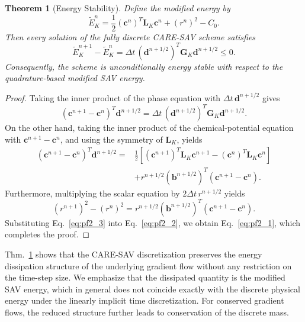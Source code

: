\documentclass[10pt,reqno]{amsart}
\newtheorem{thm}{\bf Theorem}
\newenvironment{theorem}{\begin{thm}} {\end{thm}}
\theoremstyle{remark}
\theoremstyle{definition}
\begin{document}
\begin{theorem}[Energy Stability]
\label{thm:energy stability}
Define the modified energy by
  $$
    \widetilde E_K^n=\frac12(\boldsymbol c^n)^{T}\boldsymbol{L}_K\boldsymbol c^n + (r^n)^2-C_0.
  $$
  Then every solution of the fully discrete CARE-SAV scheme satisfies
  \begin{equation}
  \label{eq:main_pf2}
    \widetilde E_K^{n+1}-\widetilde E_K^n =\Delta t\,(\boldsymbol d^{n+1/2})^{T} \boldsymbol{G}_K\boldsymbol d^{n+1/2} \le 0.
  \end{equation}
 Consequently, the scheme is unconditionally energy stable with respect to the quadrature-based modified SAV energy.
\end{theorem}
\begin{proof}
  Taking the inner product of the phase equation with $\Delta t\,\boldsymbol d^{n+1/2}$ gives
  \begin{equation}
  \label{eq:pf2_1}
    (\boldsymbol c^{n+1}-\boldsymbol c^n)^{T}\boldsymbol d^{n+1/2}=\Delta t\,(\boldsymbol d^{n+1/2})^{T} \boldsymbol{G}_K\boldsymbol d^{n+1/2}.
  \end{equation}
  On the other hand, taking the inner product of the chemical-potential equation with $\boldsymbol c^{n+1}-\boldsymbol c^n$, and using the symmetry of $\boldsymbol{L}_K$, yields
  \begin{equation}
  \label{eq:pf2_2}
    \begin{aligned}
    (\boldsymbol c^{n+1}-\boldsymbol c^n)^{T}\boldsymbol d^{n+1/2}={}&\frac12\left[(\boldsymbol c^{n+1})^{T}\boldsymbol{L}_K\boldsymbol c^{n+1}-(\boldsymbol c^n)^{T}\boldsymbol{L}_K\boldsymbol c^n\right]\\
    &+r^{n+1/2}(\boldsymbol b^{n+1/2})^{T}(\boldsymbol c^{n+1}-\boldsymbol c^n).
    \end{aligned}
  \end{equation}
  Furthermore, multiplying the scalar equation by $2\Delta t\,r^{n+1/2}$ yields
  \begin{equation}
  \label{eq:pf2_3}
    (r^{n+1})^2-(r^n)^2=r^{n+1/2}(\boldsymbol b^{n+1/2})^{T}(\boldsymbol c^{n+1}-\boldsymbol c^n).
  \end{equation}
  Substituting Eq.~\eqref{eq:pf2_3} into Eq.~\eqref{eq:pf2_2}, we obtain Eq.~\eqref{eq:pf2_1}, which completes the proof.
\end{proof}

Thm.~\ref{thm:energy stability} shows that the CARE-SAV discretization preserves the energy dissipation structure of the underlying gradient flow without any restriction on the time-step size. We emphasize that the dissipated quantity is the modified SAV energy, which in general does not coincide exactly with the discrete physical energy under the linearly implicit time discretization. For conserved gradient flows, the reduced structure further leads to conservation of the discrete mass.
\end{document}
